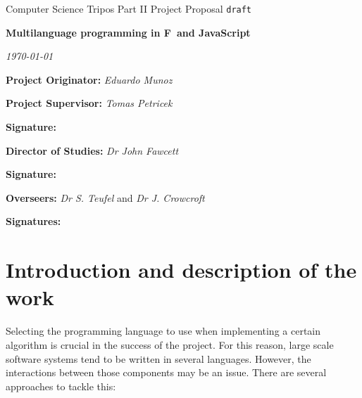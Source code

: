 \documentclass[12pt,a4paper]{article} \usepackage{a4wide}
\newcommand{\fs}{F\nolinebreak\hspace{-.05em}\raisebox{.6ex}{\tiny\bf
    \#}}
\begin{document}
\thispagestyle{empty}

 \medskip {} \medskip {}

\vfil

\centerline{\large Computer Science Tripos Part II Project Proposal \texttt{draft}}
\vspace{0.4in} \centerline{\Large\bf Multilanguage programming in
  \fs\ and JavaScript} \vspace{0.3in} \centerline{\large \emph{\today}}

\vfil

{\bf Project Originator:} \emph{Eduardo Munoz}

\vspace{0.5in}

{\bf Project Supervisor:} \emph{Tomas Petricek}

\vspace{0.2in}

{\bf Signature:}

\vspace{0.5in}

{\bf Director of Studies:} \emph{Dr John Fawcett}

\vspace{0.2in}

{\bf Signature:}

\vspace{0.5in}

{\bf Overseers:} \emph{Dr S. Teufel} and \emph{Dr J. Crowcroft}

\vspace{0.2in}

{\bf Signatures:}

\vfil \eject


\section{Introduction and description of the work}

Selecting the programming language to use when implementing a certain
algorithm is crucial in the success of the project. For this reason,
large scale software systems tend to be written in several
languages. However, the interactions between those components may be
an issue.  There are several approaches to tackle this:
\end{document}
